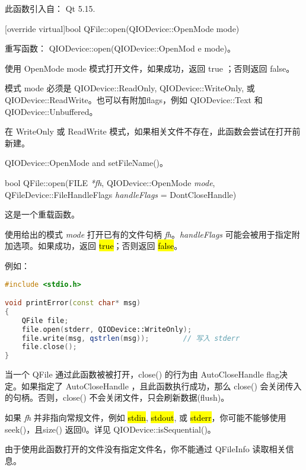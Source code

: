 此函数引入自： Qt 5.15.

[override virtual]bool QFile::open(QIODevice::OpenMode mode)

重写函数： QIODevice::open(QIODevice::OpenMod
e mode)。

使用 OpenMode mode 模式打开文件，如果成功，返回 true ；否则返回 false。

模式 mode 必须是 QIODevice::ReadOnly, QIODevice::WriteOnly, 或 QIODevice::ReadWrite。也可以有附加flags，例如 QIODevice::Text 和 QIODevice::Unbuffered。

\begin{notice}
在 WriteOnly 或 ReadWrite 模式，如果相关文件不存在，此函数会尝试在打开前新建。
\end{notice} 



\begin{seeAlso}
QIODevice::OpenMode and setFileName()。
\end{seeAlso} 

bool QFile::open(FILE \emph{*fh}, QIODevice::OpenMode \emph{mode}, QFileDevice::FileHandleFlags \emph{handleFlags} = DontCloseHandle)

这是一个重载函数。

使用给出的模式 \emph{mode} 打开已有的文件句柄 \emph{fh}。\emph{handleFlags} 可能会被用于指定附加选项。如果成功，返回 \hl{true}；否则返回 \hl{false}。

例如：


\begin{lstlisting}[language=C++]
#include <stdio.h>

void printError(const char* msg)
{
    QFile file;
    file.open(stderr, QIODevice::WriteOnly);
    file.write(msg, qstrlen(msg));        // 写入 stderr
    file.close();
}
\end{lstlisting}

当一个 QFile 通过此函数被被打开，close() 的行为由 AutoCloseHandle flag决定。如果指定了 AutoCloseHandle ，且此函数执行成功，那么 close() 会关闭传入的句柄。否则，close() 不会关闭文件，只会刷新数据(flush)。

\begin{warning}

\end{warning} 

\begin{compactitem}
\item 如果 \emph{fh} 并非指向常规文件，例如 \hl{stdin}, \hl{stdout}, 或 \hl{stderr}，你可能不能够使用 seek()，且size() 返回0。详见 QIODevice::isSequential()。
\item 由于使用此函数打开的文件没有指定文件名，你不能通过 QFileInfo 读取相关信息。
\end{compactitem}

